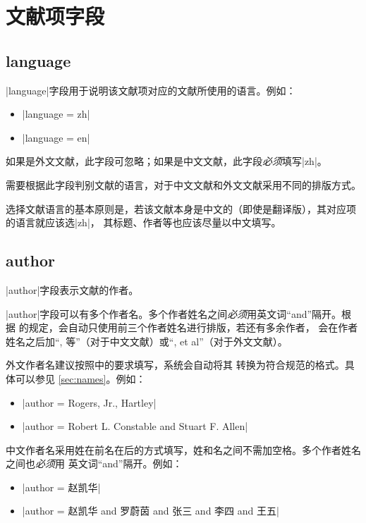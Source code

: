 
\section{文献项字段}\label{sec:bib-field}

\subsection{language}\label{subsec:bibfield-language}

|language|字段用于说明该文献项对应的文献所使用的语言。例如：
\begin{itemize}
\item |language = {zh}|
\item |language = {en}|
\end{itemize}

如果是外文文献，此字段可忽略；如果是中文文献，此字段\emph{必须}填写|zh|。

{\BibTeX}需要根据此字段判别文献的语言，对于中文文献和外文文献采用不同的排版方式。

选择文献语言的基本原则是，若该文献本身是中文的（即使是翻译版），其对应项的语言就应该选|zh|，
其标题、作者等也应该尽量以中文填写。

\subsection{author}\label{subsec:bibfield-author}

|author|字段表示文献的作者。

|author|字段可以有多个作者名。多个作者姓名之间\emph{必须}用英文词``and''隔开。根据
\cite{gbt7714-2005}的规定，{\BibTeX}会自动只使用前三个作者姓名进行排版，若还有多余作者，
会在作者姓名之后加``, 等''（对于中文文献）或``, et al''（对于外文文献）。

外文作者名建议按照\cite[157]{lamport1994latex}中的要求填写，{\BibTeX}系统会自动将其
转换为符合规范\cite{gbt7714-2005}的格式。具体可以参见
\ref{sec:names}。例如：
\begin{itemize}
\item |author = {Rogers, Jr., Hartley}|
\item |author = {Robert L. Constable and Stuart F. Allen}|
\end{itemize}

中文作者名采用姓在前名在后的方式填写，姓和名之间不需加空格。多个作者姓名之间也\emph{必须}用
英文词``and''隔开。例如：
\begin{itemize}
\item |author = {赵凯华}|
\item |author = {赵凯华 and 罗蔚茵 and 张三 and 李四 and 王五}|
\end{itemize}

